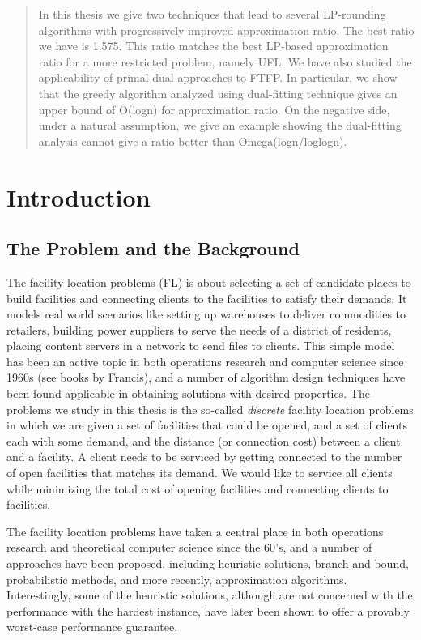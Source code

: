 \documentclass[oneside,final]{ucr}
\begin{document}
\begin{frontmatter}
\begin{abstract}
  In this thesis we give two techniques that lead to several
  LP-rounding algorithms with progressively improved approximation
  ratio. The best ratio we have is 1.575. This ratio matches the best
  LP-based approximation ratio for a more restricted problem, namely
  UFL. We have also studied the applicability of primal-dual
  approaches to FTFP. In particular, we show that the greedy algorithm
  analyzed using dual-fitting technique gives an upper bound of
  O(logn) for approximation ratio. On the negative side, under a
  natural assumption, we give an example showing the dual-fitting
  analysis cannot give a ratio better than Omega(logn/loglogn).
\end{abstract}

\tableofcontents
\listoffigures
\listoftables

\end{frontmatter}

\chapter{Introduction} \label{ch: intro}

\section{The Problem and the Background}
The facility location problems (FL) is about selecting a set of
candidate places to build facilities and connecting clients to the
facilities to satisfy their demands. It models real world scenarios
like setting up warehouses to deliver commodities to retailers,
building power suppliers to serve the needs of a district of
residents, placing content servers in a network to send files to
clients. This simple model has been an active topic in both operations
research and computer science since 1960s (see books by Francis), and
a number of algorithm design techniques have been found applicable in
obtaining solutions with desired properties. The problems we study in
this thesis is the so-called \emph{discrete} facility location
problems in which we are given a set of facilities that could be
opened, and a set of clients each with some demand, and the distance
(or connection cost) between a client and a facility. A client needs
to be serviced by getting connected to the number of open facilities that
matches its demand. We would like to service all clients while
minimizing the total cost of opening facilities and connecting clients
to facilities.

The facility location problems have taken a central place in both
operations research and theoretical computer science since the 60's,
and a number of approaches have been proposed, including heuristic
solutions, branch and bound, probabilistic methods, and more recently,
approximation algorithms. Interestingly, some of the heuristic
solutions, although are not concerned with the performance with the
hardest instance, have later been shown to offer a provably worst-case
performance guarantee.
\end{document}
